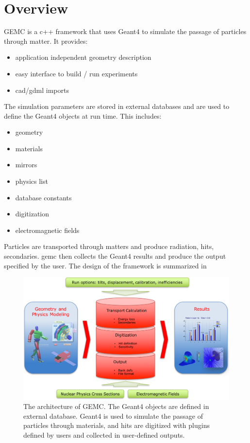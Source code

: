 \section{Overview}

GEMC \cite{gemc} is a c++ framework that uses Geant4 \cite{geant4} to simulate the passage of particles through matter. It provides:
\begin{itemize}
	\item application independent geometry description
	\item easy interface to build / run experiments
	\item cad/gdml imports
\end{itemize}

The simulation parameters are stored in external databases and are used to define the Geant4 objects at run time. This includes:
\begin{itemize}
	\item geometry
	\item materials
	\item mirrors
	\item physics list
	\item database constants
	\item digitization
	\item electromagnetic fields
\end{itemize}

Particles are transported through matters and produce radiation, hits, secondaries.
gemc then collects the Geant4 results and produce the output specified by the user.
The design of the framework is summarized in 

\begin{figure}
	\centering
	\includegraphics[width=0.98\columnwidth,keepaspectratio]{img/gemcDesign.png}
	\caption{The architecture of GEMC. The Geant4 objects are defined in external database. Geant4 is used to simulate the
             passage of particles through materials, and hits are digitized with plugins defined by users
             and collected in user-defined outputs. }
	\label{fig:gemcDesign}
\end{figure}



